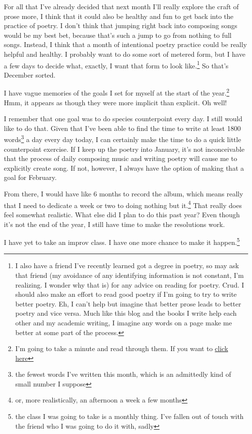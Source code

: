 \documentclass[12pt]{article}[titlepage]
\newcommand{\1}{\={a}}
\newcommand{\2}{\={e}}
\newcommand{\3}{\={\i}}
\newcommand{\4}{\=o}
\newcommand{\5}{\=u}
\newcommand{\6}{\={A}}
\renewcommand{\,}{\textsuperscript{,}}
\begin{document}
For all that I've already decided that next month I'll really explore the craft of prose more, I think that it could also be healthy and fun to get back into the practice of poetry.
I don't think that jumping right back into composing songs would be my best bet, because that's such a jump to go from nothing to full songs.
Instead, I think that a month of intentional poetry practice could be really helpful and healthy.
I probably want to do some sort of metered form, but I have a few days to decide what, exactly, I want that form to look like.\footnote{I also have a friend I've recently learned got a degree in poetry, so may ask that friend (my avoidance of any identifying information is not constant, I'm realizing. I wonder why that is) for any advice on reading for poetry.
Crud. I should also make an effort to read good poetry if I'm going to try to write better poetry.
Eh, I can't help but imagine that better prose leads to better poetry and vice versa.
Much like this blog and the books I write help each other and my academic writing, I imagine any words on a page make me better at some part of the process.}
So that's December sorted.

I have vague memories of the goals I set for myself at the start of the year.\footnote{I'm going to take a minute and read through them. If you want to \href{reflection-2022.html}{click here}}
Hmm, it appears as though they were more implicit than explicit.
Oh well! 

I remember that one goal was to do species counterpoint every day.
I still would like to do that.
Given that I've been able to find the time to write at least 1800 words\footnote{the fewest words I've written this month, which is an admittedly kind of small number I suppose} a day every day today, I can certainly make the time to do a quick little counterpoint exercise.
If I keep up the poetry into January, it's not inconceivable that the process of daily composing music and writing poetry will cause me to explicitly create song.
If not, however, I always have the option of making that a goal for February.

From there, I would have like 6 months to record the album, which means really that I need to dedicate a week or two to doing nothing but it.\footnote{or, more realistically, an afternoon a week a few months}
That really does feel somewhat realistic.
What else did I plan to do this past year?
Even though it's not the end of the year, I still have time to make the resolutions work.

I have yet to take an improv class.
I have one more chance to make it happen.\footnote{the class I was going to take is a monthly thing. I've fallen out of touch with the friend who I was going to do it with, sadly}
\end{document}
